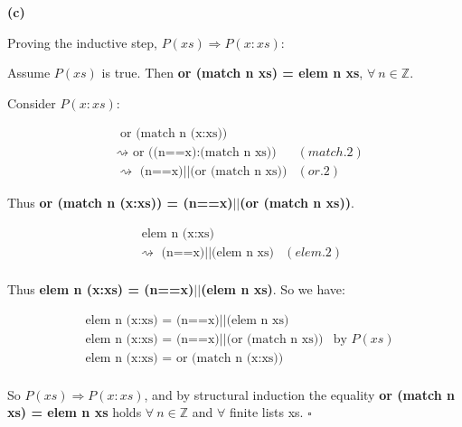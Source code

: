 \documentclass{article}
\begin{document}
\newpage

\textbf{(c)}

Proving the inductive step, $P(xs) \Rightarrow P(x:xs)$:

Assume $P(xs)$ is true. Then \textbf{or (match n xs) = elem n xs}, $\forall \:
n \in \mathbb{Z}$.

Consider $P(x:xs)$:

\begin{align*}
&\text{ or (match n (x:xs))} \\
&\rightsquigarrow \text{ or ((n==x):(match n xs))}	&(match.2) \\
&\rightsquigarrow \text{ (n==x)$||$(or (match n xs))}	&(or.2)		
\end{align*}

Thus \textbf{or (match n (x:xs)) = (n==x)$||$(or (match n xs))}.

\begin{align*}
&\text{ elem n (x:xs)} \\
&\rightsquigarrow \text{ (n==x)$||$(elem n xs)}		&(elem.2) \\
\end{align*}

Thus \textbf{elem n (x:xs) = (n==x)$||$(elem n xs)}. So we have:

\begin{align*}
&\text{elem n (x:xs) = (n==x)$||$(elem n xs)} \\
&\text{elem n (x:xs) = (n==x)$||$(or (match n xs))}	&\text{by }P(xs) \\
&\text{elem n (x:xs) = or (match n (x:xs))} \\
\end{align*}

So $P(xs) \Rightarrow P(x:xs)$, and by structural induction the equality
\textbf{or (match n xs) = elem n xs} holds $\forall \: n \in \mathbb{Z}$ and
$\forall$ finite lists xs. $\square$
\end{document}
